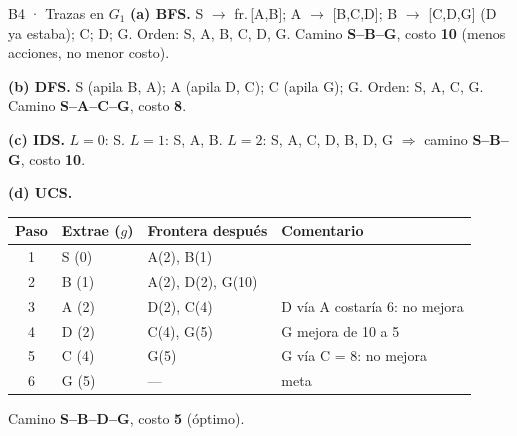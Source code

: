 \begin{solucion}{B4 · Trazas en $G_1$}
\textbf{(a) BFS.} S $\to$ fr.\,[A,B]; A $\to$ [B,C,D]; B $\to$ [C,D,G] (D ya estaba); C; D; G.
Orden: S, A, B, C, D, G. Camino \textbf{S–B–G}, costo \textbf{10} (menos acciones, no menor costo).

\textbf{(b) DFS.} S (apila B, A); A (apila D, C); C (apila G); G. Orden: S, A, C, G. Camino
\textbf{S–A–C–G}, costo \textbf{8}.

\textbf{(c) IDS.} $L=0$: S. $L=1$: S, A, B. $L=2$: S, A, C, D, B, D, G $\Rightarrow$ camino
\textbf{S–B–G}, costo \textbf{10}.

\textbf{(d) UCS.}
\begin{center}\small
\begin{tabular}{clll}
\toprule
Paso & Extrae ($g$) & Frontera después & Comentario\\
\midrule
1 & S (0) & A(2), B(1) & \\
2 & B (1) & A(2), D(2), G(10) & \\
3 & A (2) & D(2), C(4) & D vía A costaría 6: no mejora\\
4 & D (2) & C(4), G(5) & G mejora de 10 a 5\\
5 & C (4) & G(5) & G vía C = 8: no mejora\\
6 & G (5) & — & meta\\
\bottomrule
\end{tabular}
\end{center}
Camino \textbf{S–B–D–G}, costo \textbf{5} (óptimo).
\end{solucion}

